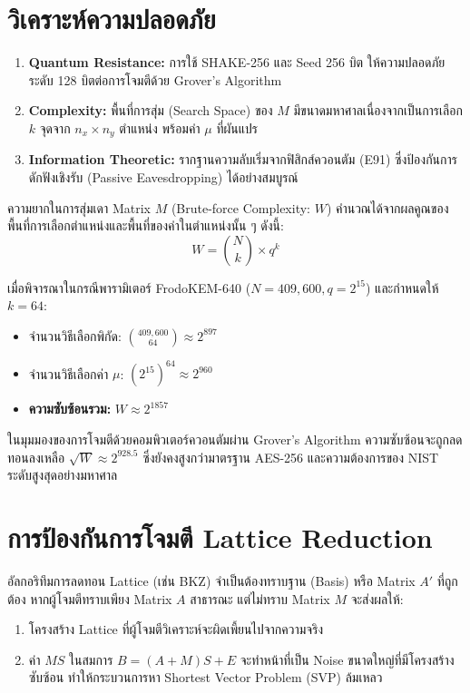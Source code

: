 \documentclass[twocolumn, a4paper]{article}
\begin{document}
	\section{วิเคราะห์ความปลอดภัย}
	\begin{enumerate}
		\item \textbf{Quantum Resistance:} การใช้ SHAKE-256 และ Seed 256 บิต ให้ความปลอดภัยระดับ 128 บิตต่อการโจมตีด้วย Grover's Algorithm
		\item \textbf{Complexity:} พื้นที่การสุ่ม (Search Space) ของ $M$ มีขนาดมหาศาลเนื่องจากเป็นการเลือก $k$ จุดจาก $n_x \times n_y$ ตำแหน่ง พร้อมค่า $\mu$ ที่ผันแปร
		\item \textbf{Information Theoretic:} รากฐานความลับเริ่มจากฟิสิกส์ควอนตัม (E91) ซึ่งป้องกันการดักฟังเชิงรับ (Passive Eavesdropping) ได้อย่างสมบูรณ์
	\end{enumerate}
	
	ความยากในการสุ่มเดา Matrix $M$ (Brute-force Complexity: $W$) คำนวณได้จากผลคูณของพื้นที่การเลือกตำแหน่งและพื้นที่ของค่าในตำแหน่งนั้น ๆ ดังนี้:
	\begin{equation}
		W = \binom{N}{k} \times q^k
	\end{equation}
	
	เมื่อพิจารณาในกรณีพารามิเตอร์ FrodoKEM-640 ($N = 409,600, q = 2^{15}$) และกำหนดให้ $k = 64$:
	\begin{itemize}
		\item จำนวนวิธีเลือกพิกัด: $\binom{409,600}{64} \approx 2^{897}$
		\item จำนวนวิธีเลือกค่า $\mu$: $(2^{15})^{64} \approx 2^{960}$
		\item \textbf{ความซับซ้อนรวม:} $W \approx 2^{1857}$
	\end{itemize}
	
	ในมุมมองของการโจมตีด้วยคอมพิวเตอร์ควอนตัมผ่าน Grover's Algorithm ความซับซ้อนจะถูกลดทอนลงเหลือ $\sqrt{W} \approx 2^{928.5}$ ซึ่งยังคงสูงกว่ามาตรฐาน AES-256 และความต้องการของ NIST ระดับสูงสุดอย่างมหาศาล
	
	\section{การป้องกันการโจมตี Lattice Reduction}
	อัลกอริทึมการลดทอน Lattice (เช่น BKZ) จำเป็นต้องทราบฐาน (Basis) หรือ Matrix $A'$ ที่ถูกต้อง หากผู้โจมตีทราบเพียง Matrix $A$ สาธารณะ แต่ไม่ทราบ Matrix $M$ จะส่งผลให้:
	\begin{enumerate}
		\item โครงสร้าง Lattice ที่ผู้โจมตีวิเคราะห์จะผิดเพี้ยนไปจากความจริง
		\item ค่า $MS$ ในสมการ $B = (A+M)S + E$ จะทำหน้าที่เป็น Noise ขนาดใหญ่ที่มีโครงสร้างซับซ้อน ทำให้กระบวนการหา Shortest Vector Problem (SVP) ล้มเหลว
	\end{enumerate}
	
\end{document}
